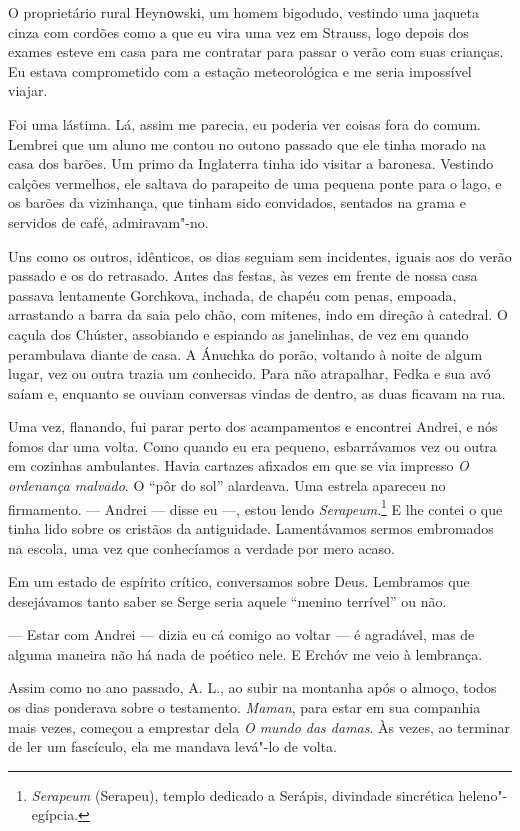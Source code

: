 O proprietário rural Heynоwski, um homem bigodudo, vestindo uma jaqueta
cinza com cordões como a que eu vira uma vez em Strauss, logo depois dos
exames esteve em casa para me contratar para passar o verão com suas
crianças. Eu estava comprometido com a estação meteorológica e me seria
impossível viajar.

Foi uma lástima. Lá, assim me parecia, eu poderia ver coisas fora do
comum. Lembrei que um aluno me contou no outono passado que ele tinha
morado na casa dos barões. Um primo da Inglaterra tinha ido visitar a
baronesa. Vestindo calções vermelhos, ele saltava do parapeito de uma
pequena ponte para o lago, e os barões da vizinhança, que tinham sido
convidados, sentados na grama e servidos de café, admiravam"-no.

Uns como os outros, idênticos, os dias seguiam sem incidentes, iguais
aos do verão passado e os do retrasado. Antes das festas, às vezes em
frente de nossa casa passava lentamente Gorchkova, inchada, de chapéu
com penas, empoada, arrastando a barra da saia pelo chão, com mitenes,
indo em direção à catedral. O caçula dos Chúster, assobiando e espiando
as janelinhas, de vez em quando perambulava diante de casa. A Ánuchka do
porão, voltando à noite de algum lugar, vez ou outra trazia um
conhecido. Para não atrapalhar, Fedka e sua avó saíam e, enquanto se
ouviam conversas vindas de dentro, as duas ficavam na rua.

Uma vez, flanando, fui parar perto dos acampamentos e encontrei Andrei,
e nós fomos dar uma volta. Como quando eu era pequeno, esbarrávamos vez
ou outra em cozinhas ambulantes. Havia cartazes afixados em que se via
impresso \emph{O ordenança malvado}. O ``pôr do sol'' alardeava. Uma
estrela apareceu no firmamento. --- Andrei --- disse eu ---, estou lendo
\emph{Serapeum}.\footnote{\emph{Serapeum} (Serapeu), templo dedicado a
  Serápis, divindade sincrética heleno"-egípcia.} E lhe contei o que
tinha lido sobre os cristãos da antiguidade. Lamentávamos sermos
embromados na escola, uma vez que conhecíamos a verdade por mero acaso.

Em um estado de espírito crítico, conversamos sobre Deus. Lembramos que
desejávamos tanto saber se Serge seria aquele ``menino terrível'' ou
não.

--- Estar com Andrei --- dizia eu cá comigo ao voltar --- é agradável,
mas de alguma maneira não há nada de poético nele. E Erchóv me veio à
lembrança.

Assim como no ano passado, A. L., ao subir na montanha após o almoço,
todos os dias ponderava sobre o testamento. \emph{Maman}, para estar em
sua companhia mais vezes, começou a emprestar dela \emph{O mundo das
damas}. Às vezes, ao terminar de ler um fascículo, ela me mandava
levá"-lo de volta.

